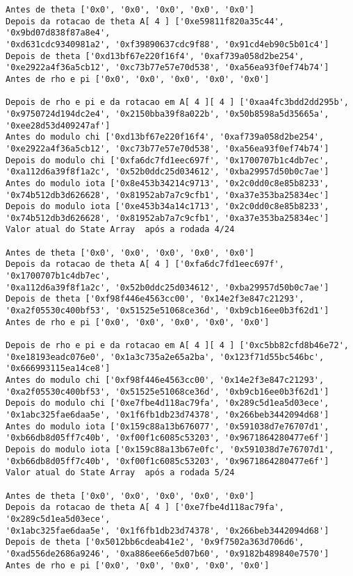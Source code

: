 \documentclass[12pt, a4paper]{article}
\begin{document}
\begin{enumerate}
\begin{enumerate}
\begin{verbatim}
Antes de theta ['0x0', '0x0', '0x0', '0x0', '0x0']
Depois da rotacao de theta A[ 4 ] ['0xe59811f820a35c44', '0x9bd07d838f87a8e4',
'0xd631cdc9340981a2', '0xf39890637cdc9f88', '0x91cd4eb90c5b01c4']
Depois de theta ['0xd13bf67e220f16f4', '0xaf739a058d2be254',
'0xe2922a4f36a5cb12', '0xc73b77e57e70d538', '0xa56ea93f0ef74b74']
Antes de rho e pi ['0x0', '0x0', '0x0', '0x0', '0x0']

Depois de rho e pi e da rotacao em A[ 4 ][ 4 ] ['0xaa4fc3bdd2dd295b',
'0x9750724d194dc2e4', '0x2150bba39f8a022b', '0x50b8598a5d35665a',
'0xee28d53d409247af']
Antes do modulo chi ['0xd13bf67e220f16f4', '0xaf739a058d2be254',
'0xe2922a4f36a5cb12', '0xc73b77e57e70d538', '0xa56ea93f0ef74b74']
Depois do modulo chi ['0xfa6dc7fd1eec697f', '0x1700707b1c4db7ec',
'0xa112d6a39f8f1a2c', '0x52b0ddc25d034612', '0xba29957d50b0c7ae']
Antes do modulo iota ['0x8e453b34214c9713', '0x2c0dd0c8e85b8233',
'0x74b512db3d626628', '0x81952ab7a7c9cfb1', '0xa37e353ba25834ec']
Depois do modulo iota ['0xe453b34a14c1713', '0x2c0dd0c8e85b8233',
'0x74b512db3d626628', '0x81952ab7a7c9cfb1', '0xa37e353ba25834ec']
Valor atual do State Array  após a rodada 4/24

Antes de theta ['0x0', '0x0', '0x0', '0x0', '0x0']
Depois da rotacao de theta A[ 4 ] ['0xfa6dc7fd1eec697f', '0x1700707b1c4db7ec',
'0xa112d6a39f8f1a2c', '0x52b0ddc25d034612', '0xba29957d50b0c7ae']
Depois de theta ['0xf98f446e4563cc00', '0x14e2f3e847c21293',
'0xa2f05530c400bf53', '0x51525e51068ce36d', '0xb9cb16ee0b3f62d1']
Antes de rho e pi ['0x0', '0x0', '0x0', '0x0', '0x0']

Depois de rho e pi e da rotacao em A[ 4 ][ 4 ] ['0xc5bb82cfd8b46e72',
'0xe18193eadc076e0', '0x1a3c735a2e65a2ba', '0x123f71d55bc546bc',
'0x666993115ea14ce8']
Antes do modulo chi ['0xf98f446e4563cc00', '0x14e2f3e847c21293',
'0xa2f05530c400bf53', '0x51525e51068ce36d', '0xb9cb16ee0b3f62d1']
Depois do modulo chi ['0xe7fbe4d118ac79fa', '0x289c5d1ea5d03ece',
'0x1abc325fae6daa5e', '0x1f6fb1db23d74378', '0x266beb3442094d68']
Antes do modulo iota ['0x159c88a13b676077', '0x591038d7e76707d1',
'0xb66db8d05ff7c40b', '0xf00f1c6085c53203', '0x9671864280477e6f']
Depois do modulo iota ['0x159c88a13b67e0fc', '0x591038d7e76707d1',
'0xb66db8d05ff7c40b', '0xf00f1c6085c53203', '0x9671864280477e6f']
Valor atual do State Array  após a rodada 5/24

Antes de theta ['0x0', '0x0', '0x0', '0x0', '0x0']
Depois da rotacao de theta A[ 4 ] ['0xe7fbe4d118ac79fa', '0x289c5d1ea5d03ece',
'0x1abc325fae6daa5e', '0x1f6fb1db23d74378', '0x266beb3442094d68']
Depois de theta ['0x5012bb6cdeab41e2', '0x9f7502a363d706d6',
'0xad556de2686a9246', '0xa886ee66e5d07b60', '0x9182b489840e7570']
Antes de rho e pi ['0x0', '0x0', '0x0', '0x0', '0x0']


\end{verbatim}
\end{enumerate}
\end{enumerate}
\end{document}
